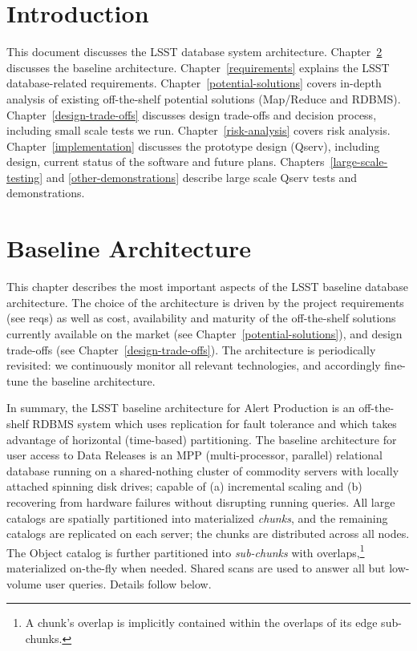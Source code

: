 \documentclass[DM,lsstdraft,toc]{lsstdoc}
\begin{document}
\section{Introduction}\label{introduction}

This document discusses the LSST database system architecture. Chapter~\ref{baseline-architecture} discusses the baseline
architecture. Chapter~\ref{requirements} explains the LSST database-related
requirements. Chapter~\ref{potential-solutions} covers in-depth analysis
of existing off-the-shelf potential solutions (Map/Reduce and RDBMS).
Chapter~\ref{design-trade-offs} discusses design trade-offs
and decision process, including small scale tests we run.
Chapter~\ref{risk-analysis} covers risk analysis.
Chapter~\ref{implementation} discusses the
prototype design (Qserv), including design, current status of the
software and future plans.
Chapters~\ref{large-scale-testing} and \ref{other-demonstrations}
describe large scale Qserv
tests and demonstrations.

\section{Baseline Architecture}\label{baseline-architecture}

This chapter describes the most important aspects of the LSST baseline
database architecture. The choice of the architecture is driven by the
project requirements (see reqs) as well as cost, availability and
maturity of the off-the-shelf solutions currently available on the
market (see Chapter~\ref{potential-solutions}), and design trade-offs (see
Chapter~\ref{design-trade-offs}). The architecture is periodically revisited: we
continuously monitor all relevant technologies, and accordingly
fine-tune the baseline architecture.

In summary, the LSST baseline architecture for Alert Production is an
off-the-shelf RDBMS system which uses replication for fault tolerance
and which takes advantage of horizontal (time-based) partitioning. The
baseline architecture for user access to Data Releases is an MPP
(multi-processor, parallel) relational database running on a
shared-nothing cluster of commodity servers with locally attached
spinning disk drives; capable of (a) incremental scaling and (b)
recovering from hardware failures without disrupting running queries.
All large catalogs are spatially partitioned into materialized
\emph{chunks}, and the remaining catalogs are replicated on each server;
the chunks are distributed across all nodes. The Object catalog is
further partitioned into \emph{sub-chunks} with overlaps,\footnote{A
  chunk's overlap is implicitly contained within the overlaps of its
  edge sub-chunks.} materialized on-the-fly when needed. Shared scans
are used to answer all but low-volume user queries. Details follow
below.
\end{document}
